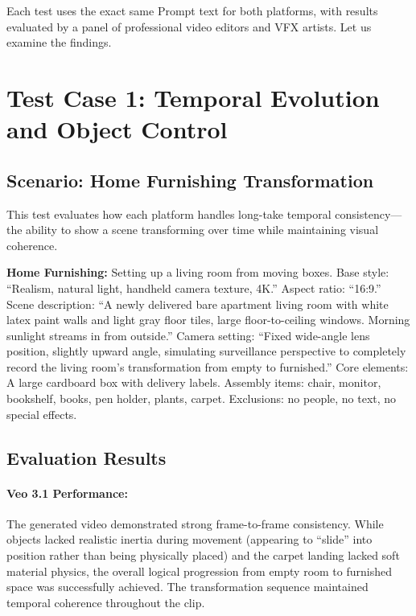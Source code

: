 Each test uses the exact same Prompt text for both platforms, with results evaluated by a panel of professional video editors and VFX artists. Let us examine the findings.

\section{Test Case 1: Temporal Evolution and Object Control}
\label{sec:test-case-1}

\subsection{Scenario: Home Furnishing Transformation}

This test evaluates how each platform handles long-take temporal consistency---the ability to show a scene transforming over time while maintaining visual coherence.

\begin{promptbox}
\small
\textbf{Home Furnishing:} Setting up a living room from moving boxes. Base style: ``Realism, natural light, handheld camera texture, 4K.'' Aspect ratio: ``16:9.'' Scene description: ``A newly delivered bare apartment living room with white latex paint walls and light gray floor tiles, large floor-to-ceiling windows. Morning sunlight streams in from outside.'' Camera setting: ``Fixed wide-angle lens position, slightly upward angle, simulating surveillance perspective to completely record the living room's transformation from empty to furnished.'' Core elements: A large cardboard box with delivery labels. Assembly items: chair, monitor, bookshelf, books, pen holder, plants, carpet. Exclusions: no people, no text, no special effects.
\end{promptbox}

\subsection{Evaluation Results}

\paragraph{Veo 3.1 Performance:}
The generated video demonstrated strong frame-to-frame consistency. While objects lacked realistic inertia during movement (appearing to ``slide'' into position rather than being physically placed) and the carpet landing lacked soft material physics, the overall logical progression from empty room to furnished space was successfully achieved. The transformation sequence maintained temporal coherence throughout the clip.

